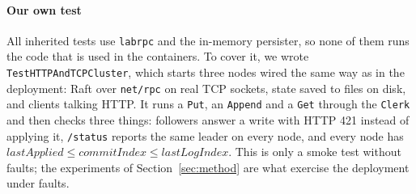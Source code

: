 \documentclass[conference]{IEEEtran}
\begin{document}
\paragraph{Our own test} All inherited tests use \texttt{labrpc} and the in-memory persister, so none of them runs the code that is used in the containers. To cover it,
we wrote \texttt{TestHTTPAndTCPCluster}, which starts three nodes wired the same way as in the deployment: Raft over \texttt{net/rpc} on real TCP sockets, state saved to files on disk,
and clients talking HTTP\@. It runs a \texttt{Put}, an \texttt{Append} and a \texttt{Get} through the \texttt{Clerk} and then checks three things:
followers answer a write with HTTP 421 instead of applying it, \texttt{/status} reports the same leader on every node,
and every node has $\textit{lastApplied} \le \textit{commitIndex} \le \textit{lastLogIndex}$. This is only a smoke test without faults;
the experiments of Section~\ref{sec:method} are what exercise the deployment under faults.



\end{document}
